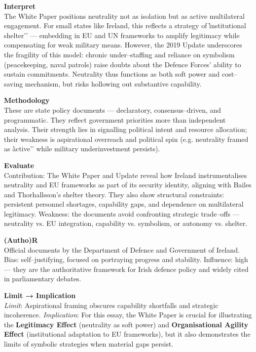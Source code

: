\textbf{Interpret} \\
The White Paper positions neutrality not as isolation but as active multilateral engagement. For small states like Ireland, this reflects a strategy of \`\`institutional shelter’’ — embedding in EU and UN frameworks to amplify legitimacy while compensating for weak military means. However, the 2019 Update underscores the fragility of this model: chronic under–staffing and reliance on symbolism (peacekeeping, naval patrols) raise doubts about the Defence Forces’ ability to sustain commitments. Neutrality thus functions as both soft power and cost–saving mechanism, but risks hollowing out substantive capability.

\textbf{Methodology} \\
These are state policy documents — declaratory, consensus–driven, and programmatic. They reflect government priorities more than independent analysis. Their strength lies in signalling political intent and resource allocation; their weakness is aspirational overreach and political spin (e.g. neutrality framed as \`\`active’’ while military underinvestment persists).

\textbf{Evaluate} \\
Contribution: The White Paper and Update reveal how Ireland instrumentalises neutrality and EU frameworks as part of its security identity, aligning with Bailes and Thorhallsson’s shelter theory. They also show structural constraints: persistent personnel shortages, capability gaps, and dependence on multilateral legitimacy. Weakness: the documents avoid confronting strategic trade–offs — neutrality vs. EU integration, capability vs. symbolism, or autonomy vs. shelter.

\textbf{(Autho)R} \\
Official documents by the Department of Defence and Government of Ireland. Bias: self–justifying, focused on portraying progress and stability. Influence: high — they are the authoritative framework for Irish defence policy and widely cited in parliamentary debates.

\textbf{Limit → Implication} \\
\textit{Limit}: Aspirational framing obscures capability shortfalls and strategic incoherence.
\textit{Implication}: For this essay, the White Paper is crucial for illustrating the \textbf{Legitimacy Effect} (neutrality as soft power) and \textbf{Organisational Agility Effect} (institutional adaptation to EU frameworks), but it also demonstrates the limits of symbolic strategies when material gaps persist.

